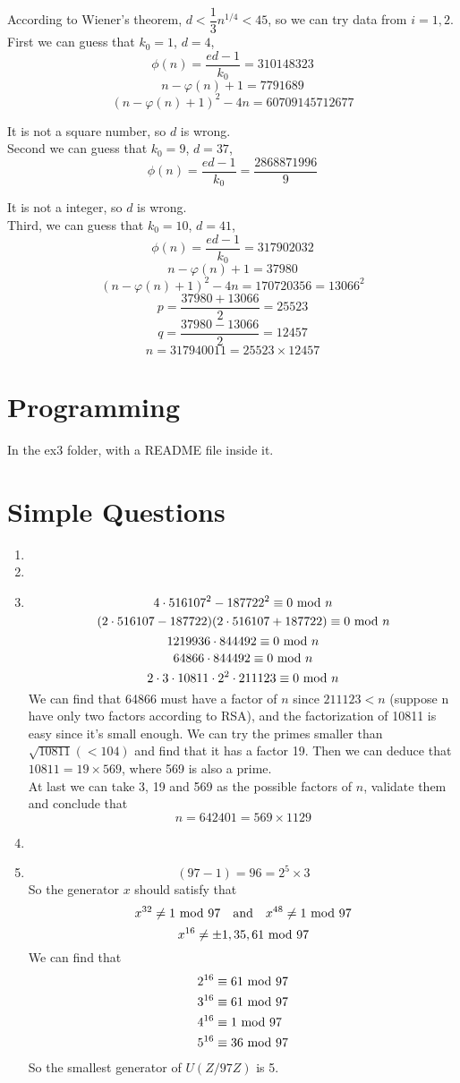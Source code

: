 \documentclass{article}
\renewcommand{\mod}{{\rm\ mod\ }}
\begin{document}
According to Wiener's theorem, $d<\dfrac{1}{3}n^{1/4}<45$, so we can try data from $i=1,2$.\\

First we can guess that $k_0=1$, $d=4$, $$\phi(n)=\frac{ed-1}{k_0}=310148323$$
$$n-\varphi(n)+1=7791689$$
$$(n-\varphi(n)+1)^2-4n=60709145712677$$

It is not a square number, so $d$ is wrong.\\

Second we can guess that $k_0=9$, $d=37$, $$\phi(n)=\frac{ed-1}{k_0}=\frac{2868871996}{9}$$

It is not a integer, so $d$ is wrong.\\

Third, we can guess that $k_0=10$, $d=41$, $$\phi(n)=\frac{ed-1}{k_0}=317902032$$
$$n-\varphi(n)+1=37980$$
$$(n-\varphi(n)+1)^2-4n=170720356=13066^2$$
$$p=\frac{37980+13066}{2}=25523$$
$$q=\frac{37980-13066}{2}=12457$$
$$n=317940011=25523\times12457$$

\section{Programming}
In the ex3 folder, with a README file inside it.

\section{Simple Questions}
\begin{enumerate}
\item
\item
\item
$$4\cdot516107^2-187722^2\equiv0\mod n$$
$$(2\cdot516107-187722)(2\cdot516107+187722)\equiv0\mod n$$
$$1219936\cdot844492\equiv0\mod n$$
$$64866\cdot844492\equiv0\mod n$$
$$2\cdot3\cdot10811\cdot2^2\cdot211123\equiv0\mod n$$
We can find that 64866 must have a factor of $n$ since $211123<n$ (suppose n have only two factors according to RSA), and the factorization of 10811 is easy since it's small enough. We can try the primes smaller than $\sqrt{10811}(<104)$ and find that it has a factor 19. Then we can deduce that $10811=19\times569$, where 569 is also a prime.\\

At last we can take 3, 19 and 569 as the possible factors of $n$,  validate them and conclude that
$$n=642401=569\times1129$$
\item
\item
$$(97-1)=96=2^5\times3$$
So the generator $x$ should satisfy that 
$$x^{32}\neq 1\mod 97\quad{\rm and}\quad x^{48}\neq 1\mod 97$$
$$x^{16}\neq \pm 1,35,61\mod 97$$
We can find that
\begin{align*}
2^{16}&\equiv61\mod97\\
3^{16}&\equiv61\mod97\\
4^{16}&\equiv1\mod97\\
5^{16}&\equiv36\mod97
\end{align*}
So the smallest generator of $U(Z/97Z)$ is 5.
\end{enumerate}
\end{document}
